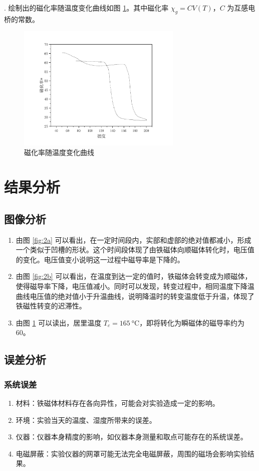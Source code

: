 \documentclass[a4paper,utf8]{article}
\begin{document}
\Fign. 绘制出的磁化率随温度变化曲线如图 \ref{fig:2c}。其中磁化率 $\chi_g=C V(T)$，$C$ 为互感电桥的常数。
\begin{figure}[!ht]
    \caption{磁化率随温度变化曲线}\label{fig:2c}
    \includegraphics[width=0.7\textwidth]{wjj/fig2b.pdf}
\end{figure}
\section{结果分析}
\subsection{图像分析}
\begin{enumerate}
    \item 由图 \ref{fig:2a} 可以看出，在一定时间段内，实部和虚部的绝对值都减小，形成一个类似于凹槽的形状。这个时间段体现了由铁磁体向顺磁体转化时，电压值的变化。电压值变小说明这一过程中磁导率是下降的。
    \item 由图 \ref{fig:2b} 可以看出，在温度到达一定的值时，铁磁体会转变成为顺磁体，使得磁导率下降，电压值减小。同时可以发现，转变过程中，相同温度下降温曲线电压值的绝对值小于升温曲线，说明降温时的转变温度低于升温，体现了铁磁性转变的迟滞性。
    \item 由图 \ref{fig:2c} 可以读出，居里温度 $T_c=\SI{165}{\degreeCelsius}$，即将转化为瞬磁体的磁导率约为 60。
\end{enumerate}
\subsection{误差分析}
\subsubsection{系统误差}
\begin{enumerate}
    \item 材料：铁磁体材料存在各向异性，可能会对实验造成一定的影响。
    \item 环境：实验当天的温度、湿度所带来的误差。
    \item 仪器：仪器本身精度的影响，如仪器本身测量和取点可能存在的系统误差。
    \item 电磁屏蔽：实验仪器的网罩可能无法完全电磁屏蔽，周围的磁场会影响实验结果。
\end{enumerate}
\end{document}
